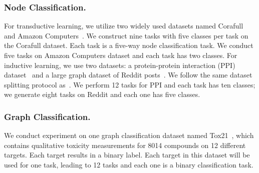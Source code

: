 \documentclass[letterpaper]{article} %
\begin{document}
\subsubsection{Node Classification.}
For transductive learning, we utilize two widely
used datasets named Corafull \cite{bojchevski2017deep} and Amazon Computers~\cite{mcauley2015image}.
We construct nine tasks with five classes per task
on the Corafull dataset. 
Each task is a five-way node classification task.
We conduct five tasks on Amazon Computers 
dataset and 
each task has two classes.
For inductive learning, we use two datasets: a protein-protein interaction (PPI) dataset~\cite{zitnik2017predicting} 
and a large graph dataset of 
Reddit posts~\cite{hamilton2017inductive}.
We follow the same dataset splitting protocol as~\cite{hamilton2017inductive}.
We perform 12 tasks for PPI and each task has ten classes;
we generate eight tasks on Reddit 
and each one has five classes.


\subsubsection{Graph Classification.}
We conduct experiment on one graph classification dataset 
named Tox21~\cite{huang2014profiling}, 
which contains qualitative toxicity measurements 
for 8014 compounds on 12 different targets. 
Each target results in a binary label.
Each target in this dataset will be used for one task,
leading to 12 tasks and each one is a binary classification task. 
\end{document}
